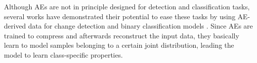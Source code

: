 \documentclass[journal,article,submit,pdftex,moreauthors]{Definitions/mdpi}
\begin{document}
Although \ac{AEs} are not in principle designed for detection and classification tasks, several works have demonstrated their potential to ease these tasks by using \ac{AE}-derived data for change detection and binary classification models \cite{LopezFandino2018,Luppino2024,Kalinicheva2019}. Since \ac{AEs} are trained to compress and afterwards reconstruct the input data, they basically learn to model samples belonging to a certain joint distribution, leading the model to learn class-specific properties.


\end{document}
